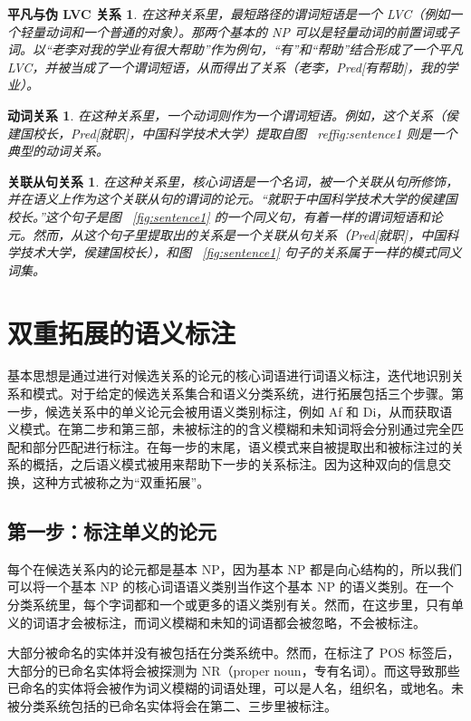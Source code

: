 \newtheorem*{CDLR}{平凡与伪 LVC 关系}
\begin{CDLR}
    在这种关系里，最短路径的谓词短语是一个 LVC（例如一个轻量动词和一个普通的对象）。那两个基本的 NP 可以是轻量动词的前置词或子词。以“老李对我的学业有很大帮助”作为例句，“有”和“帮助”结合形成了一个平凡 LVC，并被当成了一个谓词短语，从而得出了关系（老李，Pred[有帮助]，我的学业）。
\end{CDLR}
\newtheorem*{VR}{动词关系}
\begin{VR}
    在这种关系里，一个动词则作为一个谓词短语。例如，这个关系（侯建国校长，Pred[就职]，中国科学技术大学）提取自图 ~ref{fig:sentence1} 则是一个典型的动词关系。
\end{VR}
\newtheorem*{RCR}{关联从句关系}
\begin{RCR}
    在这种关系里，核心词语是一个名词，被一个关联从句所修饰，并在语义上作为这个关联从句的谓词的论元。“就职于中国科学技术大学的侯建国校长。”这个句子是图 ~\ref{fig:sentence1} 的一个同义句，有着一样的谓词短语和论元。然而，从这个句子里提取出的关系是一个关联从句关系（Pred[就职]，中国科学技术大学，侯建国校长），和图 ~\ref{fig:sentence1} 句子的关系属于一样的模式同义词集。
\end{RCR}

\section{双重拓展的语义标注}
基本思想是通过进行对候选关系的论元的核心词语进行词语义标注，迭代地识别关系和模式。对于给定的候选关系集合和语义分类系统，进行拓展包括三个步骤。第一步，候选关系中的单义论元会被用语义类别标注，例如 Af 和 Di，从而获取语义模式。在第二步和第三部，未被标注的的含义模糊和未知词将会分别通过完全匹配和部分匹配进行标注。在每一步的末尾，语义模式来自被提取出和被标注过的关系的概括，之后语义模式被用来帮助下一步的关系标注。因为这种双向的信息交换，这种方式被称之为“双重拓展”。

\subsection{第一步：标注单义的论元}
每个在候选关系内的论元都是基本 NP，因为基本 NP 都是向心结构的\citep{endocentric2017}，所以我们可以将一个基本 NP 的核心词语语义类别当作这个基本 NP 的语义类别。在一个分类系统里，每个字词都和一个或更多的语义类别有关。然而，在这步里，只有单义的词语才会被标注，而词义模糊和未知的词语都会被忽略，不会被标注。

大部分被命名的实体并没有被包括在分类系统中。然而，在标注了 POS 标签后，大部分的已命名实体将会被探测为 NR（proper noun，专有名词）。而这导致那些已命名的实体将会被作为词义模糊的词语处理，可以是人名，组织名，或地名。未被分类系统包括的已命名实体将会在第二、三步里被标注。

